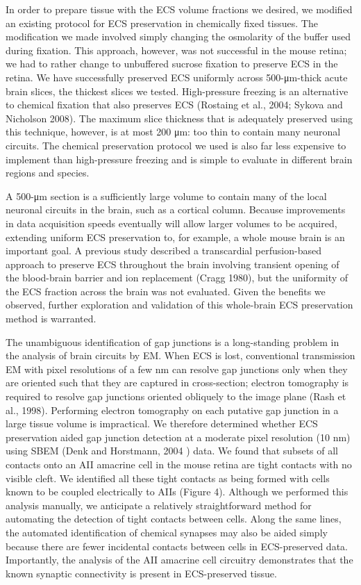 \documentclass{article}
\begin{document}
In order to prepare tissue with the ECS volume fractions we desired, we modified an existing protocol for ECS preservation in chemically fixed tissues. The modification we made involved simply changing the osmolarity of the buffer used during fixation. This approach, however, was not successful in the mouse retina; we had to rather change to unbuffered sucrose fixation to preserve ECS in the retina. We have successfully preserved ECS uniformly across 500-μm-thick acute brain slices, the thickest slices we tested. High-pressure freezing is an alternative to chemical fixation that also preserves ECS (Rostaing et al., 2004; Sykova and Nicholson 2008). The maximum slice thickness that is adequately preserved using this technique, however, is at most 200 μm: too thin to contain many neuronal circuits. The chemical preservation protocol we used is also far less expensive to implement than high-pressure freezing and is simple to evaluate in different brain regions and species.

A 500-μm section is a sufficiently large volume to contain many of the local neuronal circuits in the brain, such as a cortical column. Because improvements in data acquisition speeds eventually will allow larger volumes to be acquired, extending uniform ECS preservation to, for example, a whole mouse brain is an important goal. A previous study described a transcardial perfusion-based approach to preserve ECS throughout the brain involving transient opening of the blood-brain barrier and ion replacement (Cragg 1980), but the uniformity of the ECS fraction across the brain was not evaluated. Given the benefits we observed, further exploration and validation of this whole-brain ECS preservation method is warranted.

The unambiguous identification of gap junctions is a long-standing problem in the analysis of brain circuits by EM. When ECS is lost, conventional transmission EM with pixel resolutions of a few nm can resolve gap junctions only when they are oriented such that they are captured in cross-section; electron tomography is required to resolve gap junctions oriented obliquely to the image plane (Rash et al., 1998). Performing electron tomography on each putative gap junction in a large tissue volume is impractical. We therefore determined whether ECS preservation aided gap junction detection at a moderate pixel resolution (10 nm) using SBEM (Denk and Horstmann, 2004 ) data. We found that subsets of all contacts onto an AII amacrine cell in the mouse retina are tight contacts with no visible cleft. We identified all these tight contacts as being formed with cells known to be coupled electrically to AIIs (Figure 4). Although we performed this analysis manually, we anticipate a relatively straightforward method for automating the detection of tight contacts between cells. Along the same lines, the automated identification of chemical synapses may also be aided simply because there are fewer incidental contacts between cells in ECS-preserved data. Importantly, the analysis of the AII amacrine cell circuitry demonstrates that the known synaptic connectivity is present in ECS-preserved tissue.
\end{document}
